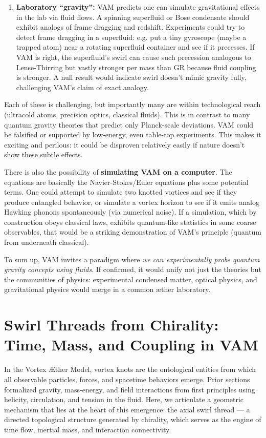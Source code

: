 \documentclass[preprint]{revtex4-2}
\begin{document}
\begin{enumerate}
        \item \textbf{Laboratory “gravity”:}
        VAM predicts one can simulate gravitational effects in the lab via fluid flows. A spinning superfluid or Bose condensate should exhibit analogs of frame dragging and redshift. Experiments could try to detect frame dragging in a superfluid: e.g. put a tiny gyroscope (maybe a trapped atom) near a rotating superfluid container and see if it precesses. If VAM is right, the superfluid’s swirl can cause such precession analogous to Lense-Thirring but vastly stronger per mass than GR because fluid coupling is stronger. A null result would indicate swirl doesn’t mimic gravity fully, challenging VAM’s claim of exact analogy.

    \end{enumerate}

    Each of these is challenging, but importantly many are within technological reach (ultracold atoms, precision optics, classical fluids). This is in contrast to many quantum gravity theories that predict only Planck-scale deviations. VAM could be falsified or supported by low-energy, even table-top experiments. This makes it exciting and perilous: it could be disproven relatively easily if nature doesn’t show these subtle effects.

    There is also the possibility of \textbf{simulating VAM on a computer}. The equations are basically the Navier-Stokes/Euler equations plus some potential terms. One could attempt to simulate two knotted vortices and see if they produce entangled behavior, or simulate a vortex horizon to see if it emits analog Hawking phonons spontaneously (via numerical noise). If a simulation, which by construction obeys classical laws, exhibits quantum-like statistics in some coarse observables, that would be a striking demonstration of VAM’s principle (quantum from underneath classical).

    To sum up, VAM invites a paradigm where \emph{we can experimentally probe quantum gravity concepts using fluids}. If confirmed, it would unify not just the theories but the communities of physics: experimental condensed matter, optical physics, and gravitational physics would merge in a common æther laboratory.

\section{Swirl Threads from Chirality: Time, Mass, and Coupling in VAM}

    In the Vortex Æther Model, vortex knots are the ontological entities from which all observable particles, forces, and spacetime behaviors emerge. Prior sections formalized gravity, mass-energy, and field interactions from first principles using helicity, circulation, and tension in the fluid. Here, we articulate a geometric mechanism that lies at the heart of this emergence: the axial swirl thread — a directed topological structure generated by chirality, which serves as the engine of time flow, inertial mass, and interaction connectivity.
\end{document}
